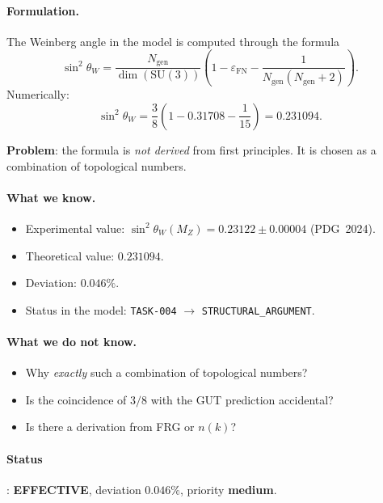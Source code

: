 \documentclass[11pt,a4paper]{article}
\newcommand{\SU}{\ensuremath{\mathrm{SU}}}
\theoremstyle{definition}
\begin{document}
\paragraph{Formulation.}
The Weinberg angle in the model is computed through the formula
\begin{equation}
    \sin^2\theta_W = \frac{N_{\text{gen}}}{\dim(\SU(3))}
    \left( 1 - \varepsilon_{\text{FN}} - \frac{1}{N_{\text{gen}}
    (N_{\text{gen}} + 2)} \right).
    \label{eq:sin2-formula}
\end{equation}
Numerically:
\begin{equation}
    \sin^2\theta_W = \frac{3}{8} \left(1 - 0.31708 - \frac{1}{15}\right)
    = 0.231094.
\end{equation}

\medskip\noindent
\textbf{Problem}: the formula is \emph{not derived} from first
principles. It is chosen as a combination of topological
numbers.

\paragraph{What we know.}
\begin{itemize}
    \item Experimental value:
          $\sin^2\theta_W(M_Z) = 0.23122 \pm 0.00004$ (PDG~2024).
    \item Theoretical value: $0.231094$.
    \item Deviation: $0.046\%$.
    \item Status in the model: \texttt{TASK-004} $\to$
          \texttt{STRUCTURAL\_ARGUMENT}.
\end{itemize}

\paragraph{What we do not know.}
\begin{itemize}
    \item Why \emph{exactly} such a combination of topological
          numbers?
    \item Is the coincidence of $3/8$ with the GUT prediction
          accidental?
    \item Is there a derivation from FRG or $n(k)$?
\end{itemize}

\paragraph{Status}: \textbf{EFFECTIVE}, deviation $0.046\%$,
priority \textbf{medium}.
\end{document}
